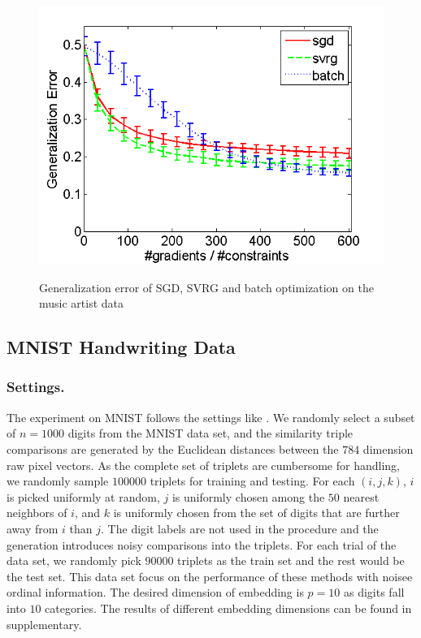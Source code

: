 \documentclass[letterpaper]{article}
\begin{document}
\begin{figure}
{				\includegraphics[scale=0.33]{Music_TSTE_200_test.png}
			}
			\caption{Generalization error of SGD, SVRG and batch optimization on the music artist data}
			\label{fig:3} %
		\end{figure}

		\subsection{MNIST Handwriting Data}
		\subsubsection{Settings.}
		The experiment on MNIST follows the settings like \cite{vandermaaten2012stochastic}. We randomly select a subset of $n=1000$ digits from the MNIST data set, and the similarity triple comparisons are generated by the Euclidean distances between the $784$ dimension raw pixel vectors. As the complete set of triplets are cumbersome for handling, we randomly sample $100000$ triplets for training and testing. For each $(i, j, k)$, $i$ is picked uniformly at random, $j$ is uniformly chosen among the $50$ nearest neighbors of $i$, and $k$ is uniformly chosen from the set of digits that are further away from $i$ than $j$. The digit labels are not used in the procedure and the generation introduces noisy comparisons into the triplets. For each trial of the data set, we randomly pick $90000$ triplets as the train set and the rest would be the test set. This data set focus on the performance of these methods with noisee ordinal information. The desired dimension of embedding is $p = 10$ as digits fall into $10$ categories. The results of different embedding dimensions can be found in supplementary.
\end{document}
